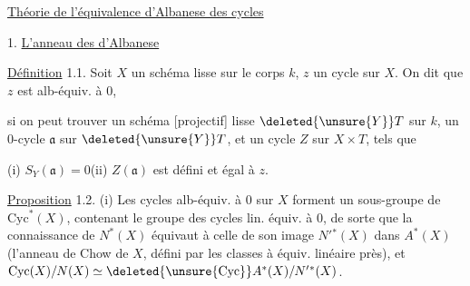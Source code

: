 
\uline{Théorie de l'équivalence d'Albanese des cycles}

1. \uline{L'anneau des  d'Albanese}

\uline{Définition} 1.1. Soit $X$ un schéma \deleted{[projectif]} lisse sur le corps $k$, $z$ un cycle sur $X$. On dit que $z$ est alb-équiv. à $0$,


si on peut trouver un schéma [projectif] lisse  $\deleted{\unsure{Y}}T$ sur $k$,  un $0$-cycle  $\mathfrak a$ sur $\deleted{\unsure{Y}}T$, et un cycle $Z$ sur $X\times T$, tels que

(i)  $S_Y(\mathfrak a)=0$\qquad (ii) $Z(\mathfrak a)$ est défini et égal à $z$.

\uline{Proposition} 1.2. (i) Les cycles alb-équiv. à $0$ sur $X$ forment un sous-groupe  de $\mathrm{Cyc}^*(X)$, contenant le groupe des cycles lin. équiv. à $0$, de sorte que la connaissance de $N^*(X)$ équivaut à celle de son image $N'{}^*(X)$ dans  $A^*(X)$ (l'anneau de Chow de $X$, défini par les classes à équiv. linéaire près), et $\mathrm{Cyc}(X)/N(X)\simeq\deleted{\unsure{\mathrm{Cyc}}}A^*(X)/N'{}^*(X)$.

